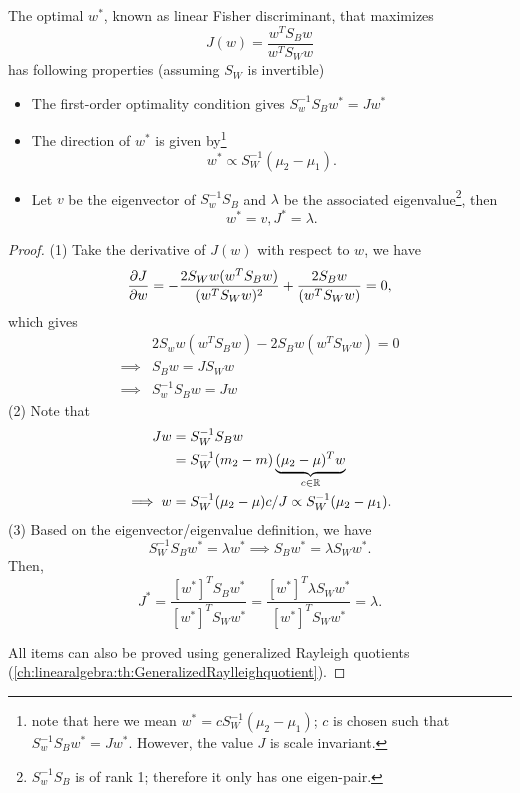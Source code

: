 \begin{refsection}
\begin{lemma}\cite[186]{bishop2006pattern}\label{ch:statistical-learning:th:OptimalityConditionFisherCriterion}
	The optimal $w^*$, known as linear Fisher discriminant, that maximizes
	$$J(w) = \frac{w^TS_Bw}{w^TS_Ww}$$
	has following properties (assuming $S_W$ is invertible)
	\begin{itemize}
		\item The first-order optimality condition gives $S_w^{-1}S_Bw^* = Jw^*$
		\item The direction of $w^*$ is given by\footnote{note that here we mean $w^* = c S_W^{-1}(\mu_2 - \mu_1)$; $c$ is chosen such that $S_w^{-1}S_Bw^* = Jw^*$. However, the value $J$ is scale invariant.}
		$$w^* \propto S_W^{-1}(\mu_2 - \mu_1).$$
		\item Let $v$ be the eigenvector of $S_w^{-1}S_B$ and $\lambda$ be the associated eigenvalue\footnote{$S_w^{-1}S_B$ is of rank 1; therefore it only has one eigen-pair.}, then 
		$$w^* = v, J^*=\lambda.$$
	\end{itemize}	
\end{lemma}
\begin{proof}
	(1)	
	Take the derivative of $J(w)$ with respect to $w$, we have
	$$\frac{\partial J}{\partial w} = -\frac{2S_Ww(w^TS_Bw)}{(w^TS_Ww)^2} + \frac{2S_Bw}{(w^TS_Ww)} = 0,$$
	which gives
	\begin{align*}
	&2S_ww(w^TS_Bw) - 2S_Bw(w^TS_Ww) = 0 \\
	\implies& S_Bw = JS_Ww \\
	\implies& S_w^{-1}S_Bw = Jw
	\end{align*}
	(2)	
	Note that
	\begin{align*}
	Jw &= S_W^{-1}S_Bw\\
	&= S_W^{-1}(m_2 - m)\underbrace{(\mu_2-\mu)^Tw}_{c\in\mathbb{R}}\\
	\implies w &=  S_W^{-1}(\mu_2 - \mu)c/J   \propto S_W^{-1} (\mu_2-\mu_1).
	\end{align*}
	(3)
	Based on the eigenvector/eigenvalue definition, we have
	$$S_W^{-1}S_B w^* = \lambda w^* \implies S_B w^* = \lambda S_W w^*.$$
	Then, 
	$$J^* = \frac{[w^*]^TS_Bw^*}{[w^*]^TS_Ww^*} = \frac{[w^*]^T\lambda S_W w^*}{[w^*]^TS_Ww^*} = \lambda. $$
	
	All items can also be proved using generalized Rayleigh quotients (\autoref{ch:linearalgebra:th:GeneralizedRaylleighquotient}).
\end{proof}


\end{refsection}
